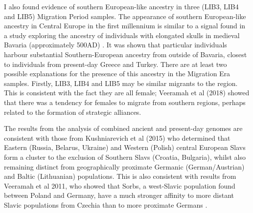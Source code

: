 I also found evidence of southern European-like ancestry in three (LIB3, LIB4 and LIB5) Migration Period samples. The appearance of southern European-like ancestry in Central Europe in the first millennium is similar to a signal found in a study exploring the ancestry of individuals with elongated skulls in medieval Bavaria (approximately 500AD) \cite{Veeramah2018}. It was shown that particular individuals harbour substantial Southern-European ancestry from outside of Bavaria, closest to individuals from present-day Greece and Turkey. There are at least two possible explanations for the presence of this ancestry in the Migration Era samples. Firstly, LIB3, LIB4 and LIB5 may be similar migrants to the region. This is consistent with the fact they are all female; Veeramah et al (2018) showed that there was a tendency for females to migrate from southern regions, perhaps related to the formation of strategic alliances.

The results from the analysis of combined ancient and present-day genomes are consistent with those from Kushniarevich et al (2015) \cite{Kushniarevich23015} who determined that Eastern (Russia, Belarus, Ukraine) and Western (Polish) central European Slavs form a cluster to the exclusion of Southern Slavs (Croatia, Bulgaria), whilst also remaining distinct from geographically proximate Germanic (German/Austrian) and Baltic (Lithuanian) populations. This is also consistent with results from Veeramah et al 2011, who showed that Sorbs, a west-Slavic population found between Poland and Germany, have a much stronger affinity to more distant Slavic populations from Czechia than to more proximate Germans \cite{veeramah2011genetic}. 

